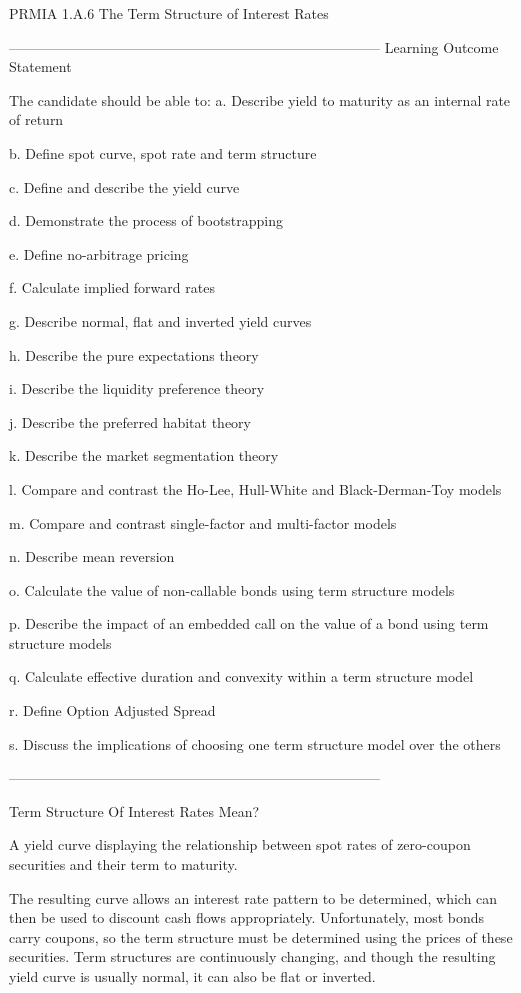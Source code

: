 
PRMIA 1.A.6 The Term Structure of Interest Rates


--------------------------------------------------------------------------------
Learning Outcome Statement

The candidate should be able to:
a.
  Describe yield to maturity as an internal rate of return

b.
  Define spot curve, spot rate and term structure

c.
  Define and describe the yield curve

d.
  Demonstrate the process of bootstrapping

e.
  Define no-arbitrage pricing

f.
  Calculate implied forward rates

g.
  Describe normal, flat and inverted yield curves

h.
  Describe the pure expectations theory

i.
  Describe the liquidity preference theory

j.
  Describe the preferred habitat theory

k.
  Describe the market segmentation theory

l.
  Compare and contrast the Ho-Lee, Hull-White and Black-Derman-Toy models

m.
  Compare and contrast single-factor and multi-factor models

n.
  Describe mean reversion

o.
  Calculate the value of non-callable bonds using term structure models

p.
  Describe the impact of an embedded call on the value of a bond using term structure models

q.
  Calculate effective duration and convexity within a term structure model

r.
  Define Option Adjusted Spread

s.
  Discuss the implications of choosing one term structure model over the others




--------------------------------------------------------------------------------


Term Structure Of Interest Rates Mean?

A yield curve displaying the relationship between spot rates of zero-coupon securities and their term to maturity.






The resulting curve allows an interest rate pattern to be determined, which can then be used to discount cash flows appropriately. Unfortunately, most bonds carry coupons, so the term structure must be determined using the prices of these securities. Term structures are continuously changing, and though the resulting yield curve is usually normal, it can also be flat or inverted.


